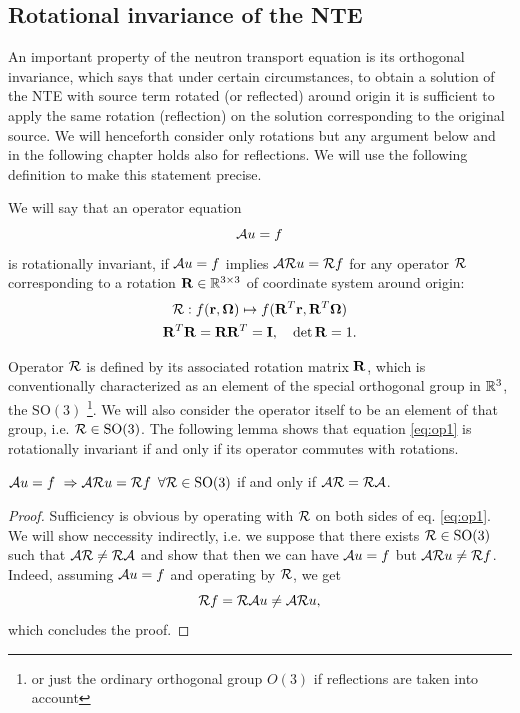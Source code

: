 \subsection{Rotational invariance of the NTE}\label{sec:rotinv}
An important property of the neutron transport equation is its orthogonal invariance, which says that under certain
circumstances, to obtain a solution of the NTE with source term rotated (or reflected) around origin it is sufficient to
apply the same rotation (reflection) on the solution corresponding to the original source. We will henceforth consider
only rotations but any argument below and in the following chapter holds also for reflections. We will use the
following definition to make this statement precise.
 
\begin{definition}\label{def:rotinv}
We will say that an
operator equation
\begin{equation}\label{eq:op1} 
\genop{A}u = f
\end{equation}
is rotationally invariant, if $\genop{A}u = f$ implies $\genop{A}\genop{R}u = \genop{R}f$ for any operator
$\op{\genop{R}}$ corresponding to a rotation $\mat{R}\in\R[3\times3]$ of coordinate system around origin:
\begin{equation}\label{eq:def_rot}
\begin{gathered}
\genop{R}: f(\br,\bomega) \mapsto f(\mat{R}^T\br,\mat{R}^T\bomega)\\
\mat{R}^T\mat{R} = \mat{R}\mat{R}^T = \mat{I},\quad \det \mat{R} = 1.
\end{gathered}
\end{equation}
\end{definition}
Operator $\genop{R}$ is defined by its associated rotation matrix $\mat{R}$, which is conventionally
characterized as an element of the special orthogonal group in $\R[3]$, the $\mathrm{SO}(3)$ \footnote{or just the
ordinary orthogonal group $O(3)$ if reflections are taken into account}.
We will also consider the operator itself to be an element of that group, i.e.
$\genop{R} \in \mathrm{SO}(3)$. The following lemma shows that equation \eqref{eq:op1} is rotationally invariant if and
only if its operator commutes with rotations.
\begin{lemma}\label{lemma1}
	$\genop{A}u = f \ \Rightarrow \genop{A}\genop{R}u = \genop{R}f\,\ \forall \genop{R}\in \mathrm{SO}(3)$ if and only if $\genop{A}\genop{R} = \genop{R}\genop{A}$.
\end{lemma}
\begin{proof}
	Sufficiency is obvious by operating with $\genop{R}$ on both sides of eq. \eqref{eq:op1}.
	We will show neccessity indirectly, i.e. we suppose that there exists $\genop{R}\in\mathrm{SO}(3)$ such that $\genop{A}\genop{R} \neq \genop{R}\genop{A}$
	and show that then we can have $\genop{A}u = f$ but $\genop{A}\genop{R}u \neq \genop{R}f$. Indeed, assuming $\genop{A}u = f$ and operating by $\genop{R}$, we get  
	$$
		\genop{R}f = \genop{R}\genop{A}u \neq \genop{A}\genop{R}u,
	$$
	which concludes the proof.
\end{proof}

